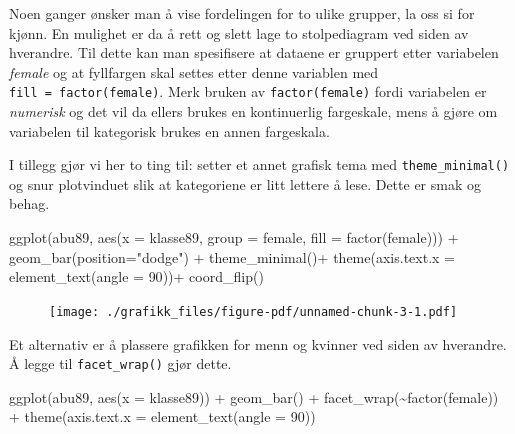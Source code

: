 \documentclass[
  letterpaper,
  DIV=11,
  numbers=noendperiod]{scrreprt}
\newenvironment{Shaded}{\begin{snugshade}}{\end{snugshade}}
\newcommand{\AttributeTok}[1]{\textcolor[rgb]{0.40,0.45,0.13}{#1}}
\newcommand{\DecValTok}[1]{\textcolor[rgb]{0.68,0.00,0.00}{#1}}
\newcommand{\FunctionTok}[1]{\textcolor[rgb]{0.28,0.35,0.67}{#1}}
\newcommand{\NormalTok}[1]{\textcolor[rgb]{0.00,0.23,0.31}{#1}}
\newcommand{\SpecialCharTok}[1]{\textcolor[rgb]{0.37,0.37,0.37}{#1}}
\newcommand{\StringTok}[1]{\textcolor[rgb]{0.13,0.47,0.30}{#1}}
\theoremstyle{definition}
\theoremstyle{remark}
\begin{document}
Noen ganger ønsker man å vise fordelingen for to ulike grupper, la oss
si for kjønn. En mulighet er da å rett og slett lage to stolpediagram
ved siden av hverandre. Til dette kan man spesifisere at dataene er
gruppert etter variabelen \emph{female} og at fyllfargen skal settes
etter denne variablen med \texttt{fill\ =\ factor(female)}. Merk bruken
av \texttt{factor(female)} fordi variabelen er \emph{numerisk} og det
vil da ellers brukes en kontinuerlig fargeskale, mens å gjøre om
variabelen til kategorisk brukes en annen fargeskala.

I tillegg gjør vi her to ting til: setter et annet grafisk tema med
\texttt{theme\_minimal()} og snur plotvinduet slik at kategoriene er
litt lettere å lese. Dette er smak og behag.

\begin{Shaded}
\begin{Highlighting}[]
\FunctionTok{ggplot}\NormalTok{(abu89, }\FunctionTok{aes}\NormalTok{(}\AttributeTok{x =}\NormalTok{ klasse89, }\AttributeTok{group =}\NormalTok{ female, }\AttributeTok{fill =} \FunctionTok{factor}\NormalTok{(female))) }\SpecialCharTok{+}
  \FunctionTok{geom\_bar}\NormalTok{(}\AttributeTok{position=}\StringTok{"dodge"}\NormalTok{) }\SpecialCharTok{+}
  \FunctionTok{theme\_minimal}\NormalTok{()}\SpecialCharTok{+}
  \FunctionTok{theme}\NormalTok{(}\AttributeTok{axis.text.x =} \FunctionTok{element\_text}\NormalTok{(}\AttributeTok{angle =} \DecValTok{90}\NormalTok{))}\SpecialCharTok{+}
  \FunctionTok{coord\_flip}\NormalTok{()}
\end{Highlighting}
\end{Shaded}

\begin{figure}[H]

{\centering \texttt{[image: ./grafikk\_files/figure-pdf/unnamed-chunk-3-1.pdf]}

}

\end{figure}

Et alternativ er å plassere grafikken for menn og kvinner ved siden av
hverandre. Å legge til \texttt{facet\_wrap()} gjør dette.

\begin{Shaded}
\begin{Highlighting}[]
\FunctionTok{ggplot}\NormalTok{(abu89, }\FunctionTok{aes}\NormalTok{(}\AttributeTok{x =}\NormalTok{ klasse89)) }\SpecialCharTok{+}
  \FunctionTok{geom\_bar}\NormalTok{() }\SpecialCharTok{+}
  \FunctionTok{facet\_wrap}\NormalTok{(}\SpecialCharTok{\textasciitilde{}}\FunctionTok{factor}\NormalTok{(female)) }\SpecialCharTok{+}
  \FunctionTok{theme}\NormalTok{(}\AttributeTok{axis.text.x =} \FunctionTok{element\_text}\NormalTok{(}\AttributeTok{angle =} \DecValTok{90}\NormalTok{))}
\end{Highlighting}
\end{Shaded}
\end{document}
